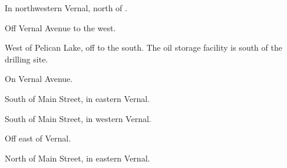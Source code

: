

\begin{LocationList}

In northwestern Vernal, north of  . %

Off  Vernal Avenue to the west.

West of Pelican Lake, off   to the south. The oil storage facility is south of the drilling site.

\Location{\GarageHQ \Garage}
On  Vernal Avenue.

South of  Main Street, in eastern Vernal.

South of   Main Street, in western Vernal.

\Location{\TruckStop \Gas \Rest \Service \Weigh \SpecialTransport}
Off  east of Vernal.

North of  Main Street, in eastern Vernal.

\end{LocationList}



